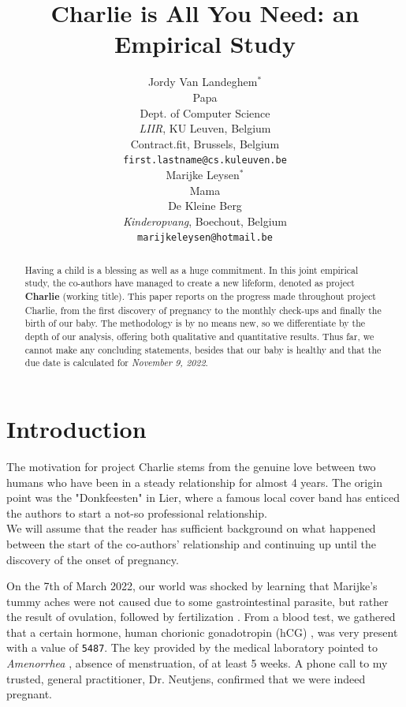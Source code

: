 \documentclass{article} %
\title{Charlie is All You Need: an Empirical Study}
\author{Jordy Van Landeghem$^{*}$ \\
  Papa \\
  Dept. of Computer Science\\
  \textit{LIIR}, KU Leuven, Belgium \\
  Contract.fit, Brussels, Belgium\\
  \texttt{first.lastname@cs.kuleuven.be} \\\And
   Marijke Leysen$^{*}$ \\
   Mama \\
  De Kleine Berg \\
  \textit{Kinderopvang}, Boechout, Belgium \\
  \texttt{marijkeleysen@hotmail.be} \\
  }
\makeatletter
\def\blfootnote{\gdef\@thefnmark{}\@footnotetext}
\makeatother
\begin{document}
\setcounter{section}{0}
\blfootnote{*: Joint first-authors.}

\maketitle

\begin{abstract}

Having a child is a blessing as well as a huge commitment. In this joint empirical study, the co-authors have managed to create a new lifeform, denoted as project \textbf{Charlie} (working title). This paper reports on the progress made throughout project Charlie, from the first discovery of pregnancy to the monthly check-ups and finally the birth of our baby.
The methodology is by no means new, so we differentiate by the depth of our analysis, offering both qualitative and quantitative results.
Thus far, we cannot make any concluding statements, besides that our baby is healthy and that the due date is calculated for \textit{November 9, 2022}.

\end{abstract}

\section{Introduction}%
The motivation for project Charlie stems from the genuine love between two humans who have been in a steady relationship for almost 4 years. The origin point was the "Donkfeesten" in Lier, where a famous local cover band has enticed the authors to start a not-so professional relationship.\\
We will assume that the reader has sufficient background on what happened between the start of the co-authors' relationship and continuing up until the discovery of the onset of pregnancy.

On the 7th of March 2022, our world was shocked by learning that Marijke's tummy aches were not caused due to some gastrointestinal parasite, but rather the result of ovulation, followed by fertilization \citep{familiari2006ultrastructural}. From a blood test, we gathered that a certain hormone, human chorionic gonadotropin (hCG) \citep{nwabuobi2017hcg}, was very present with a value of \texttt{5487}. The key provided by the medical laboratory pointed to \textit{Amenorrhea} \citep{practice2004current}, absence of menstruation, of at least 5 weeks.
A phone call to my trusted, general practitioner, Dr. Neutjens, confirmed that we were indeed pregnant. 
\end{document}
